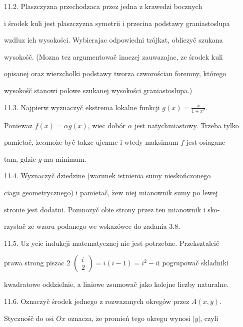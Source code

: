 \documentclass[a4paper,12pt]{article}
\begin{document}
11.2. Plaszczyzna przechodzaca przez jedna $\mathrm{z}$ krawedzi bocznych

$\mathrm{i}$ środek kuli jest plaszczyzna symetrii $\mathrm{i}$ przecina podstawy graniastoslupa

wzdluz ich wysokości. Wybierajac odpowiedni trójkat, obliczyč szukana

wysokośč. (Mozna $\mathrm{t}\mathrm{e}\dot{\mathrm{z}}$ argumentowač inaczej zauwazajac, $\dot{\mathrm{z}}\mathrm{e}$ środek kuli

opisanej oraz wierzcholki podstawy tworza czworościan foremny, którego

wysokośč stanowi polowe szukanej wysokości graniastoslupa.)

11.3. Najpierw wyznaczyč ekstrema lokalne funkcji $g(x) = \displaystyle \frac{x}{1+x^{2}}.$

Poniewaz $f(x) = \alpha g(x)$, wiec dobór $\alpha$ jest natychmiastowy. Trzeba tylko

pamietač, $\dot{\mathrm{z}}\mathrm{e}\alpha \mathrm{m}\mathrm{o}\dot{\mathrm{z}}\mathrm{e}$ byč takze ujemne $\mathrm{i}$ wtedy maksimum $f$ jest osiagane

tam, gdzie $g$ ma minimum.

11.4. Wyznaczyč dziedzine (warunek istnienia sumy nieskończonego

ciagu geometrycznego) $\mathrm{i}$ pamietač, $\dot{\mathrm{z}}\mathrm{e} \mathrm{w}$ niej mianownik sumy po lewej

stronie jest dodatni. Pomnozyč obie strony przez ten mianownik $\mathrm{i}$ sko-

rzystač ze wzoru podanego we wskazówce do zadania 3.8.

11.5. $\mathrm{U}\dot{\mathrm{z}}$ ycie indukcji matematycznej nie jest potrzebne. Przeksztalcič

prawa strong piszac 2 $\left(\begin{array}{l}
i\\
2
\end{array}\right) = i(i-1) = i^{2}-i \mathrm{i}$ pogrupowač skladniki

kwadratowe oddzielnie, a liniowe zsumowač jako kolejne liczby naturalne.

11.6. Oznaczyč środek jednego $\mathrm{z}$ rozwazanych okregów przez $A(x,y).$

Stycznośč do osi $Ox$ oznacza, $\dot{\mathrm{z}}\mathrm{e}$ promień tego okregu wynosi $|y|$, czyli
\end{document}
